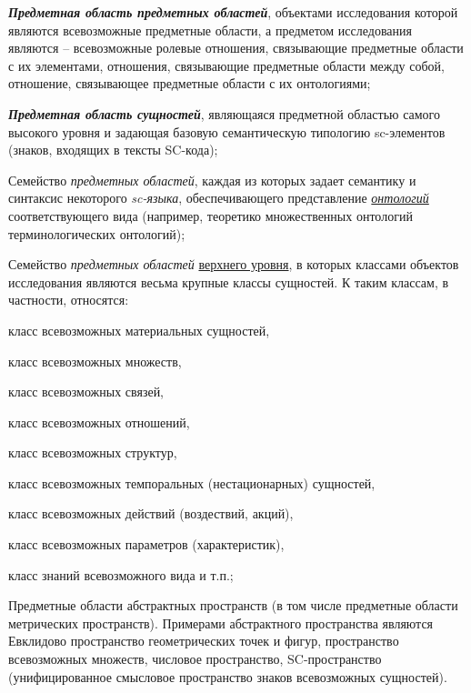 \begin{SCn}
\begin{scnsubstruct}
{\begin{scnitemize}
\item \textbf{\textit{Предметная область предметных областей}}, объектами исследования которой являются всевозможные предметные области, а предметом исследования являются -- всевозможные ролевые отношения, связывающие предметные области с их элементами, отношения, связывающие предметные области между собой, отношение, связывающее предметные области с их онтологиями;\item \textbf{\textit{Предметная область сущностей}}, являющаяся предметной областью самого высокого уровня и задающая базовую семантическую типологию sc-элементов (знаков, входящих в тексты SC-кода);\item Семейство \textit{предметных областей}, каждая из которых задает семантику и синтаксис некоторого \textit{sc-языка}, обеспечивающего представление \textit{\uline{онтологий}} соответствующего вида (например, теоретико множественных онтологий терминологических онтологий);\item Семейство \textit{предметных областей} \uline{верхнего уровня}, в которых классами объектов исследования являются весьма крупные классы сущностей. К таким классам, в частности, относятся: \begin{scnitemizeii}
\item класс всевозможных материальных сущностей,\item класс всевозможных множеств,\item класс всевозможных связей,\item класс всевозможных отношений,\item класс всевозможных структур,\item класс всевозможных темпоральных (нестационарных) сущностей,\item класс всевозможных действий (воздествий, акций),\item класс всевозможных параметров (характеристик),\item класс знаний всевозможного вида и т.п.;\end{scnitemizeii}
\item Предметные области абстрактных пространств (в том числе предметные области метрических пространств). Примерами абстрактного пространства являются Евклидово пространство геометрических точек и фигур, пространство всевозможных множеств, числовое пространство, SC-пространство (унифицированное смысловое пространство знаков всевозможных сущностей).\end{scnitemize}
}
\end{scnsubstruct}
\end{SCn}
